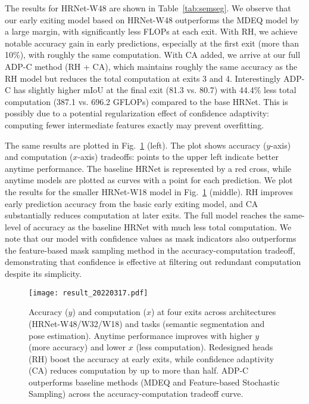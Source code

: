 The results for HRNet-W48 are shown in Table~\ref{tab:semseg}.
We observe that our early exiting model based on HRNet-W48 outperforms the MDEQ model by a large margin, with significantly less FLOPs at each exit.
With RH, we achieve notable accuracy gain in early predictions, especially at the first exit (more than 10\%), with roughly the same computation.
With CA added, we arrive at our full ADP-C method (RH + CA), which maintains roughly the same accuracy as the RH model but reduces the total computation at exits 3 and 4.
Interestingly ADP-C has slightly higher mIoU at the final exit (81.3 vs. 80.7) with 44.4\% less total computation (387.1 vs. 696.2 GFLOPs) compared to the base HRNet.
This is possibly due to a potential regularization effect of confidence adaptivity: computing fewer intermediate features exactly may prevent overfitting.



The same results are plotted in Fig.~\ref{fig:result} (left).
The plot shows accuracy ($y$-axis) and computation ($x$-axis) tradeoffs: points to the upper left indicate better anytime performance.
The baseline HRNet is represented by a red cross, while anytime models are plotted as curves with a point for each prediction.
We plot the results for the smaller HRNet-W18 model in Fig.~\ref{fig:result} (middle).
RH improves early prediction accuracy from the basic early exiting model, and CA substantially reduces computation at later exits.
The full model reaches the same-level of accuracy as the baseline HRNet with much less total computation. We note that our model with confidence values as mask indicators also outperforms the feature-based mask sampling method in the accuracy-computation tradeoff, demonstrating that confidence is effective at filtering out redundant computation despite its simplicity.

\begin{figure}[htbp]
\texttt{[image: result\_20220317.pdf]}
\caption{%
Accuracy ($y$) and computation ($x$) at four exits across architectures (HRNet-W48/W32/W18) and tasks (semantic segmentation and pose estimation).
Anytime performance improves with higher $y$ (more accuracy) and lower $x$ (less computation).
Redesigned heads (RH) boost the accuracy at early exits, while confidence adaptivity (CA) reduces computation by up to more than half.
ADP-C outperforms baseline methods (MDEQ and Feature-based Stochastic Sampling) across the accuracy-computation tradeoff curve.
}
\label{fig:result}
\end{figure}


